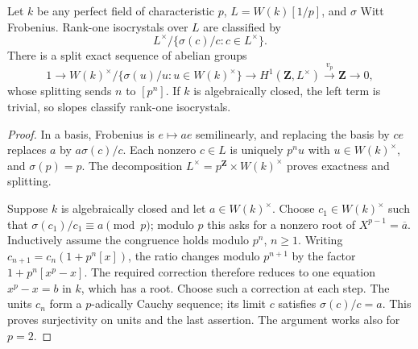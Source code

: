 \begin{proposition}\label{cat:J4}
Let $k$ be any perfect field of characteristic $p$, $L=W(k)[1/p]$, and
$\sigma$ Witt Frobenius.  Rank-one isocrystals over $L$ are classified by
\[
 L^\times/\{\sigma(c)/c:c\in L^\times\}.
\]
There is a split exact sequence of abelian groups
\[
 1\longrightarrow W(k)^\times/\{\sigma(u)/u:u\in W(k)^\times\}
 \longrightarrow H^1(\mathbf Z,L^\times)
 \xrightarrow{v_p}\mathbf Z\longrightarrow0,
\]
whose splitting sends $n$ to $[p^n]$.  If $k$ is algebraically closed,
the left term is trivial, so slopes classify rank-one isocrystals.
\end{proposition}
\begin{proof}
In a basis, Frobenius is $e\mapsto a e$ semilinearly, and replacing
the basis by $c e$ replaces $a$ by $a\sigma(c)/c$.  Each nonzero
$c\in L$ is uniquely $p^n u$ with $u\in W(k)^\times$, and
$\sigma(p)=p$.  The decomposition $L^\times=p^{\mathbf Z}\times
W(k)^\times$ proves exactness and splitting.

Suppose $k$ is algebraically closed and let $a\in W(k)^\times$.
Choose $c_1\in W(k)^\times$ such that
$\sigma(c_1)/c_1\equiv a\pmod p$; modulo $p$ this asks for a
nonzero root of $X^{p-1}=\overline a$.
Inductively assume the congruence holds modulo $p^n$, $n\geq1$.
Writing $c_{n+1}=c_n(1+p^n[x])$, the ratio changes modulo $p^{n+1}$
by the factor $1+p^n[x^p-x]$.
The required correction therefore reduces to one equation
$x^p-x=b$ in $k$, which has a root.  Choose such a correction at
each step.  The units $c_n$ form a $p$-adically Cauchy sequence;
its limit $c$ satisfies $\sigma(c)/c=a$.  This proves surjectivity
on units and the last assertion.  The argument works also for $p=2$.
\end{proof}

